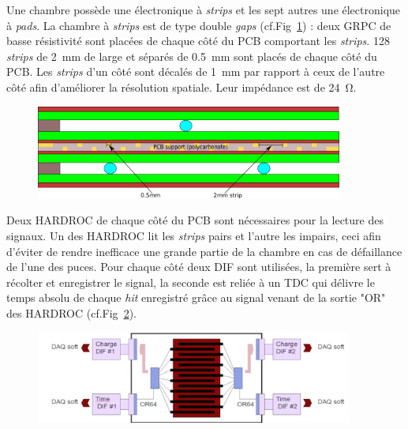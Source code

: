 Une chambre possède une électronique à \textit{strips} et les sept autres une électronique à \textit{pads}. La chambre à \textit{strips} est de type double \textit{gaps} (cf.Fig~\ref{DoubleGap}) : deux GRPC de basse résistivité sont placées de chaque côté du PCB comportant les \textit{strips}. \num{128} \textit{strips} de \SI{2}{\milli\meter} de large et séparés de \SI{0.5}{\milli\meter} sont placés de chaque côté du PCB. Les \textit{strips} d'un côté sont décalés de \SI{1}{\milli\meter} par rapport à ceux de l'autre côté afin d'améliorer la résolution spatiale. Leur impédance est de \SI{24}{\ohm}. 

\begin{figure}[ht!]
	\centering
	\includegraphics[width=0.9\textwidth]{GLA/DoubleGap.png}
	\label{DoubleGap}
\end{figure}

Deux HARDROC de chaque côté du PCB sont nécessaires pour la lecture des signaux. Un des HARDROC lit les \textit{strips} pairs et l'autre les impairs, ceci afin d'éviter de rendre inefficace une grande partie de la chambre en cas de défaillance de l'une des puces. Pour chaque côté deux DIF sont utilisées, la première sert à récolter et enregistrer le signal, la seconde est reliée à un TDC qui délivre le temps absolu de chaque \textit{hit} enregistré grâce au signal venant de la sortie "OR" des HARDROC (cf.Fig~\ref{SchemePS}).

\begin{figure}[ht!]
	\centering
	\includegraphics[width=0.93\textwidth]{GLA/SchemePS.png}
	\label{SchemePS}
\end{figure}

